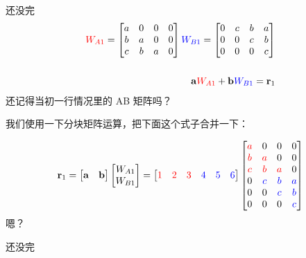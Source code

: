 \documentclass[aspectratio=169,10pt]{beamer}
\begin{document}
\begin{frame}[fragile]{还没完}
\[
\begin{aligned}
{\color{red}W_{A1}}= 
\begin{bmatrix}
a & 0 & 0 & 0 \\
b & a & 0 & 0 \\
c & b & a & 0
\end{bmatrix}
{\color{blue}W_{B1}} = 
\begin{bmatrix}
0 & c & b & a \\
0 & 0 & c & b \\
0 & 0 & 0 & c
\end{bmatrix}\\\\
\mathbf a{\color{red}W_{A1}}+\mathbf b {\color{blue}W_{B1}}=\mathbf r_1
\end{aligned}
\]
还记得当初一行情况里的 AB 矩阵吗？
\par
我们使用一下分块矩阵运算，把下面这个式子合并一下：
\par
\[
\mathbf r_1=
\begin{bmatrix}
\mathbf a & \mathbf b
\end{bmatrix}
\begin{bmatrix}
W_{A1}\\ W_{B1}
\end{bmatrix}
=
\begin{bmatrix}
\color{red}1&\color{red}2&\color{red}3&\color{blue}4&\color{blue}5&\color{blue}6
\end{bmatrix}
\begin{bmatrix}
\color{red}a&0&0&0\\
\color{red}b&\color{red}a&0&0\\
\color{red}c&\color{red}b&\color{red}a&0\\
0&\color{blue}c&\color{blue}b&\color{blue}a\\
0&0&\color{blue}c&\color{blue}b\\
0&0&0&\color{blue}c
\end{bmatrix}
\]
嗯？
\par
\end{frame}

\begin{frame}[fragile]{还没完}
\mbox{}
\end{frame}
\end{document}
